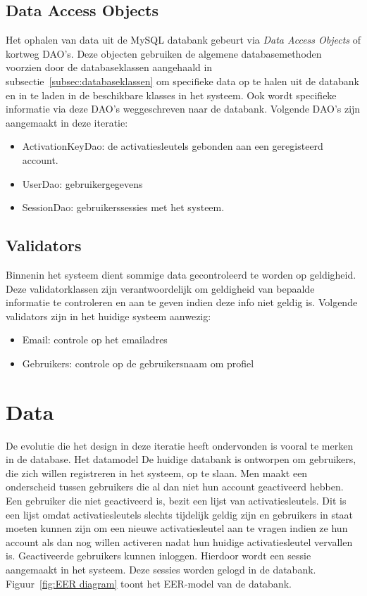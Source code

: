\subsection{Data Access Objects}
\label{subsec:dao}

Het ophalen van data uit de MySQL databank gebeurt via \emph{Data Access Objects} of kortweg DAO's. 
Deze objecten gebruiken de algemene databasemethoden voorzien door de databaseklassen aangehaald in subsectie~\ref{subsec:databaseklassen} om specifieke data op te halen uit de databank en in te laden in de beschikbare klasses in het systeem. 
Ook wordt specifieke informatie via deze DAO's weggeschreven naar de databank. 
Volgende DAO's zijn aangemaakt in deze iteratie:

\begin{itemize}
	\item ActivationKeyDao: de activatiesleutels gebonden aan een geregisteerd account. 
	\item UserDao: gebruikergegevens
	\item SessionDao: gebruikerssessies met het systeem.
\end{itemize}

\subsection{Validators}
\label{subsec:validators}

Binnenin het systeem dient sommige data gecontroleerd te worden op geldigheid. 
Deze validatorklassen zijn verantwoordelijk om geldigheid van bepaalde informatie te controleren en aan te geven indien deze info niet geldig is. 
Volgende validators zijn in het huidige systeem aanwezig:

\begin{itemize}
	\item Email: controle op het emailadres
	\item Gebruikers: controle op de gebruikersnaam om profiel
\end{itemize}

\section{Data}
\label{sec:data}
De evolutie die het design in deze iteratie heeft ondervonden is vooral te merken in de database.
Het datamodel 
De huidige databank is ontworpen om gebruikers, die zich willen registreren in het systeem, op te slaan. 
Men maakt een onderscheid tussen gebruikers die al dan niet hun account geactiveerd hebben. 
Een gebruiker die niet geactiveerd is, bezit een lijst van activatiesleutels. 
Dit is een lijst omdat activatiesleutels slechts tijdelijk geldig zijn en gebruikers in staat moeten kunnen zijn om een nieuwe activatiesleutel aan te vragen indien ze hun account als dan nog willen activeren nadat hun huidige activatiesleutel vervallen is.
Geactiveerde gebruikers kunnen inloggen. 
Hierdoor wordt een sessie aangemaakt in het systeem. 
Deze sessies worden gelogd in de databank. 
Figuur~\ref{fig:EER diagram} toont het EER-model van de databank.

